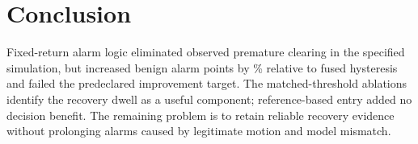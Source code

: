 \section{Conclusion}
Fixed-return alarm logic eliminated observed premature clearing in the specified simulation, but increased benign alarm points by \RelativeIncrease\% relative to fused hysteresis and failed the predeclared improvement target. The matched-threshold ablations identify the recovery dwell as a useful component; reference-based entry added no decision benefit. The remaining problem is to retain reliable recovery evidence without prolonging alarms caused by legitimate motion and model mismatch.
